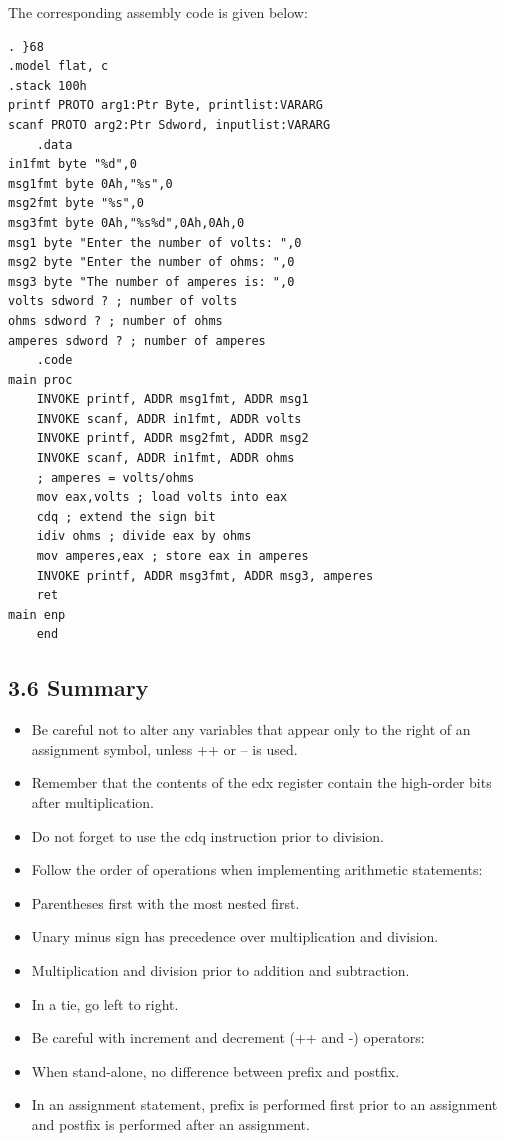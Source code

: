 \documentclass[10pt]{book}
\begin{document}
The corresponding assembly code is given below:

\begin{verbatim}
. }68
.model flat, c
.stack 100h
printf PROTO arg1:Ptr Byte, printlist:VARARG
scanf PROTO arg2:Ptr Sdword, inputlist:VARARG
    .data
in1fmt byte "%d",0
msg1fmt byte 0Ah,"%s",0
msg2fmt byte "%s",0
msg3fmt byte 0Ah,"%s%d",0Ah,0Ah,0
msg1 byte "Enter the number of volts: ",0
msg2 byte "Enter the number of ohms: ",0
msg3 byte "The number of amperes is: ",0
volts sdword ? ; number of volts
ohms sdword ? ; number of ohms
amperes sdword ? ; number of amperes
    .code
main proc
    INVOKE printf, ADDR msg1fmt, ADDR msg1
    INVOKE scanf, ADDR in1fmt, ADDR volts
    INVOKE printf, ADDR msg2fmt, ADDR msg2
    INVOKE scanf, ADDR in1fmt, ADDR ohms
    ; amperes = volts/ohms
    mov eax,volts ; load volts into eax
    cdq ; extend the sign bit
    idiv ohms ; divide eax by ohms
    mov amperes,eax ; store eax in amperes
    INVOKE printf, ADDR msg3fmt, ADDR msg3, amperes
    ret
main enp
    end
\end{verbatim}

\subsection*{3.6 Summary}
\begin{itemize}
  \item Be careful not to alter any variables that appear only to the right of an assignment symbol, unless ++ or -- is used.
  \item Remember that the contents of the edx register contain the high-order bits after multiplication.
  \item Do not forget to use the cdq instruction prior to division.
  \item Follow the order of operations when implementing arithmetic statements:
  \item Parentheses first with the most nested first.
  \item Unary minus sign has precedence over multiplication and division.
  \item Multiplication and division prior to addition and subtraction.
  \item In a tie, go left to right.
  \item Be careful with increment and decrement (++ and -) operators:
  \item When stand-alone, no difference between prefix and postfix.
  \item In an assignment statement, prefix is performed first prior to an assignment and postfix is performed after an assignment.
\end{itemize}
\end{document}
